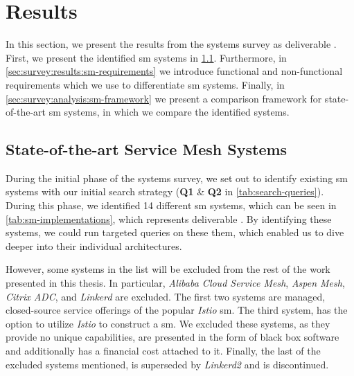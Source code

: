 \section{Results}
\label{sec:survey:results}


In this section, we present the results from the systems survey as deliverable . First, we present the identified \gls{sm} systems in \cref{sec:survey:results:sm-systems}. Furthermore, in \cref{sec:survey:results:sm-requirements} we introduce functional and non-functional requirements which we use to differentiate \gls{sm} systems. Finally, in \cref{sec:survey:analysis:sm-framework} we present a comparison framework for state-of-the-art \gls{sm} systems, in which we compare the identified systems.


\subsection{State-of-the-art Service Mesh Systems}
\label{sec:survey:results:sm-systems}

During the initial phase of the systems survey, we set out to identify existing \gls{sm} systems with our initial search strategy (\textbf{Q1} \& \textbf{Q2} in \cref{tab:search-queries}). During this phase, we identified 14 different \gls{sm} systems, which can be seen in \cref{tab:sm-implementations}, which represents deliverable . By identifying these systems, we could run targeted queries on these them, which enabled us to dive deeper into their individual architectures.



However, some systems in the list will be excluded from the rest of the work presented in this thesis. In particular, \textit{Alibaba Cloud Service Mesh},  \textit{Aspen Mesh}, \textit{Citrix ADC}, and \textit{Linkerd} are excluded. The first two systems are managed, closed-source service offerings of the popular \textit{Istio} \gls{sm}. The third system, has the option to utilize  \textit{Istio} to construct a \gls{sm}. We excluded these systems, as they provide no unique capabilities, are presented in the form of black box software and additionally has a financial cost attached to it. Finally, the last of the excluded systems mentioned, is superseded by \textit{Linkerd2} and is discontinued. 

